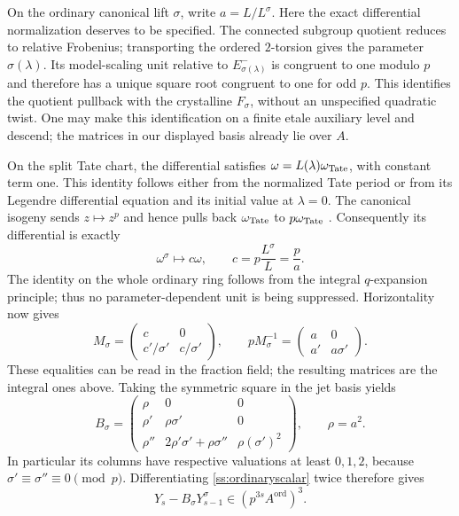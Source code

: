 \documentclass[11pt,a4paper]{article}
\begin{document}
On the ordinary canonical lift $\sigma$, write $a=L/L^\sigma$.
Here the exact differential normalization deserves to be specified.
The connected subgroup quotient reduces to relative Frobenius;
transporting the ordered $2$-torsion gives the parameter $\sigma(\lambda)$.
Its model-scaling unit relative to $E^-_{\sigma(\lambda)}$ is congruent
to one modulo $p$ and therefore has a unique square root congruent to
one for odd $p$.  This identifies the quotient pullback with the
crystalline $F_\sigma$, without an unspecified quadratic twist.
One may make this identification on a finite etale auxiliary level
and descend; the matrices in our displayed basis already lie over $A$.

On the split Tate chart, the differential satisfies
$\omega=L(\lambda)\omega_{\rm Tate}$, with constant term one.  This
identity follows either from the normalized Tate period or from its
Legendre differential equation and its initial value at $\lambda=0$.
The canonical isogeny sends $z\mapsto z^p$ and hence pulls back
$\omega_{\rm Tate}$ to $p\omega_{\rm Tate}$
\cite[Appendix~A2, especially (A2.2.1) and (A2.2.7), pp.~175--177]{Katz}.
Consequently its differential is exactly
\[
 \omega^\sigma\longmapsto c\omega,
 \qquad c=p\frac{L^\sigma}{L}=\frac p a.
\]
The identity on the whole ordinary ring follows from the integral
$q$-expansion principle; thus no parameter-dependent unit is being
suppressed.  Horizontality now gives
\[
 M_\sigma=
 \begin{pmatrix}c&0\\c'/\sigma'&c/\sigma'\end{pmatrix},
 \qquad
 pM_\sigma^{-1}=
 \begin{pmatrix}a&0\\a'&a\sigma'\end{pmatrix}.
\]
These equalities can be read in the fraction field; the resulting
matrices are the integral ones above.  Taking the symmetric square in
the jet basis yields
\begin{equation}\label{ss:Bsigma}
 B_\sigma=
 \begin{pmatrix}
 \rho&0&0\\
 \rho'&\rho\sigma'&0\\
 \rho''&2\rho'\sigma'+\rho\sigma''&\rho(\sigma')^2
 \end{pmatrix},\qquad \rho=a^2.
\end{equation}
In particular its columns have respective valuations at least $0,1,2$,
because $\sigma'\equiv\sigma''\equiv0\pmod p$.
Differentiating \eqref{ss:ordinaryscalar} twice therefore gives
\begin{equation}\label{ss:ordinaryjet}
 Y_s-B_\sigma Y_{s-1}^\sigma\in(p^{3s}A^{\mathrm{ord}})^3.
\end{equation}
\end{document}
